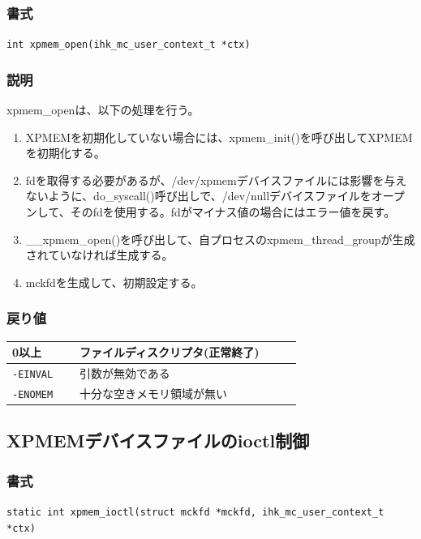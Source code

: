 \documentclass[twoside,11pt,fleqn]{book}
\begin{document}
\subsubsection*{書式}{\quad}
\texttt{int xpmem\_open(ihk\_mc\_user\_context\_t *ctx)}

\subsubsection*{説明}{\quad}
xpmem\_openは、以下の処理を行う。
\begin{enumerate}
  \item XPMEMを初期化していない場合には、xpmem\_init()を呼び出してXPMEMを初期化する。
  \item fdを取得する必要があるが、/dev/xpmemデバイスファイルには影響を与えないように、do\_syscall()呼び出しで、/dev/nullデバイスファイルをオープンして、そのfdを使用する。fdがマイナス値の場合にはエラー値を戻す。
  \item \_\_xpmem\_open()を呼び出して、自プロセスのxpmem\_thread\_groupが生成されていなければ生成する。
  \item mckfdを生成して、初期設定する。
\end{enumerate}

\subsubsection*{戻り値}{\quad}
\begin{table}[!h]
\footnotesize
\begin{tabular}{|p{0.20\linewidth}|p{0.66\linewidth}|} \hline
0以上&ファイルディスクリプタ(正常終了)\\ \hline
\texttt{-EINVAL}&引数が無効である\\ \hline
\texttt{-ENOMEM}&十分な空きメモリ領域が無い\\ \hline
\end{tabular}
\vspace{-0em}
\end{table}
\FloatBarrier

\subsection{XPMEMデバイスファイルのioctl制御}
\subsubsection*{書式}{\quad}
\texttt{static int xpmem\_ioctl(struct mckfd *mckfd, ihk\_mc\_user\_context\_t *ctx)}
\end{document}
